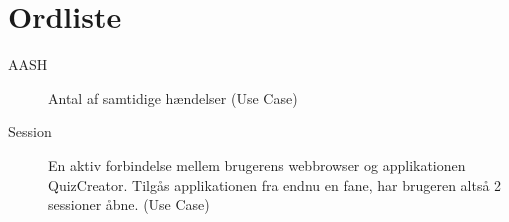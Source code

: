 \chapter{Ordliste}\label{head:ordliste}




\begin{description}
\item[AASH] Antal af samtidige hændelser (Use Case)
\item[Session] En aktiv forbindelse mellem brugerens webbrowser og applikationen QuizCreator. Tilgås applikationen fra endnu en fane, har brugeren altså 2 sessioner åbne. (Use Case)

\end{description}